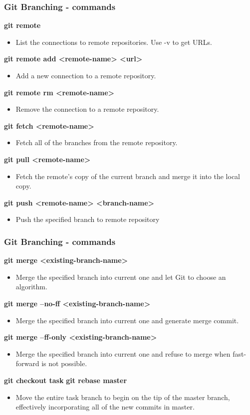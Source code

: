 \begin{frame}
\frametitle{Git Branching - commands}
\textbf{git remote}
	\begin{itemize}
	\item List the connections to remote repositories. Use -v to get URLs. 
	\end{itemize}
\textbf{git remote add <remote-name> <url>}
	\begin{itemize}
	\item Add a new connection to a remote repository.
	\end{itemize}
\textbf{git remote rm <remote-name>}
	\begin{itemize}
 	\item Remove the connection to a remote repository.
	\end{itemize}
\textbf{git fetch <remote-name>}
	\begin{itemize}
	\item Fetch all of the branches from the remote repository.
	\end{itemize}
\textbf{git pull <remote-name>}
	\begin{itemize}
	\item Fetch the remote’s copy of the current branch and merge it into the local copy.
	\end{itemize}
\textbf{git push <remote-name> <branch-name>}
	\begin{itemize}
	\item Push the specified branch to remote repository
	\end{itemize}
\end{frame}

\begin{frame}
\frametitle{Git Branching - commands}
\textbf{git merge <existing-branch-name>}
	\begin{itemize}
	\item Merge the specified branch into current one and let Git to choose an algorithm.
	\end{itemize}
\textbf{git merge --no-ff <existing-branch-name>}
	\begin{itemize}
	\item Merge the specified branch into current one and generate merge commit.
	\end{itemize}
\textbf{git merge --ff-only <existing-branch-name>}
	\begin{itemize}
	\item Merge the specified branch into current one and refuse to merge when fast-forward is not possible.
	\end{itemize}
\textbf{git checkout task} 
\textbf{git rebase master}
	\begin{itemize}
	\item Move the entire task branch to begin on the tip of the master branch, effectively incorporating all of the new commits in master.
	\end{itemize}
\end{frame}